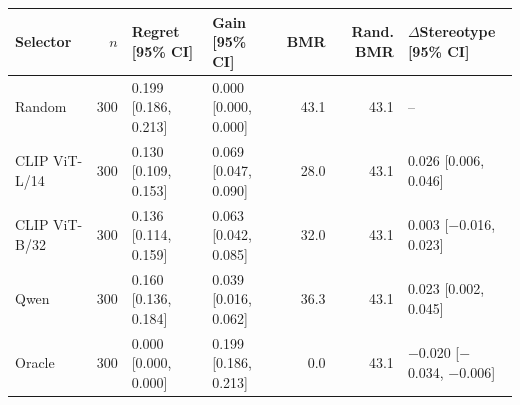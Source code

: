 
\footnotesize
\begin{tabular*}{\textwidth}{@{\extracolsep{\fill}}lrllrrl}
\toprule
Selector & $n$ & Regret [95\% CI] & Gain [95\% CI] & BMR & Rand. BMR & $\Delta$Stereotype [95\% CI]\\
\midrule
Random & 300 & 0.199 [0.186, 0.213] & 0.000 [0.000, 0.000] & 43.1 & 43.1 & --\\
CLIP ViT-L/14 & 300 & 0.130 [0.109, 0.153] & 0.069 [0.047, 0.090] & 28.0 & 43.1 & 0.026 [0.006, 0.046]\\
CLIP ViT-B/32 & 300 & 0.136 [0.114, 0.159] & 0.063 [0.042, 0.085] & 32.0 & 43.1 & 0.003 [$-$0.016, 0.023]\\
Qwen & 300 & 0.160 [0.136, 0.184] & 0.039 [0.016, 0.062] & 36.3 & 43.1 & 0.023 [0.002, 0.045]\\
Oracle & 300 & 0.000 [0.000, 0.000] & 0.199 [0.186, 0.213] & 0.0 & 43.1 & $-$0.020 [$-$0.034, $-$0.006]\\
\bottomrule
\end{tabular*}
